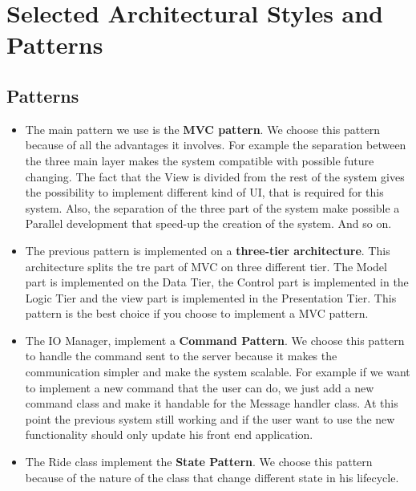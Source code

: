 \documentclass[../../../../dd.tex]{subfiles}
\begin{document}
	\section{Selected Architectural Styles and Patterns}
		\subsection{Patterns}
		\begin{itemize}
		\item The main pattern we use is the \textbf{MVC pattern}. We choose this pattern because of all the advantages it involves. For example the separation between the three main layer makes the system compatible with possible future changing. The fact that the View is divided from the rest of the system gives the possibility to implement different kind of UI, that is required for this system. Also, the separation of the three part of the system make possible a Parallel development that speed-up the creation of the system. And so on.
		
		\item The previous pattern is implemented on a \textbf{three-tier architecture}. This architecture splits the tre part of MVC on three different tier. The Model part is implemented on the Data Tier, the Control part is implemented in the Logic Tier and the view part is implemented in the Presentation Tier. This pattern is the best choice if you choose to implement a MVC pattern.
		
		\item The IO Manager, implement a \textbf{Command Pattern}. We choose this pattern to handle the command sent to the server because it makes the communication simpler and make the system scalable. For example if we want to implement a new command that the user can do, we just add a new command class and make it handable for the Message handler class. At this point the previous system still working and if the user want to use the new functionality should only update his front end application.
		
		
		\item The Ride class implement the \textbf{State Pattern}. We choose this pattern because of the nature of the class that change different state in his lifecycle.
		
		\end{itemize}
		

	
\end{document}
